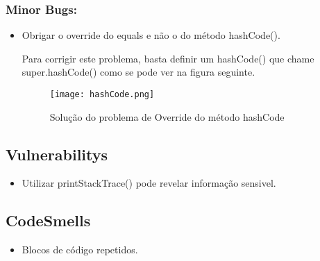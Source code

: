 \subsubsection{Minor Bugs:}
\begin{itemize}
\item Obrigar o override do equals e não o do método hashCode().\newline


\par Para corrigir este problema, basta definir um hashCode() que chame super.hashCode() como se pode ver na figura seguinte.

\begin{figure}[H]

  \centering

  \texttt{[image: hashCode.png]}

  \caption {Solução do problema de Override do método hashCode}

  \label {fig08}

\end{figure}

\end{itemize}


\subsection{Vulnerabilitys}
\begin{itemize}
\item Utilizar printStackTrace() pode revelar informação sensivel.\newline
\end{itemize}

\subsection{CodeSmells}

\begin{itemize}
\item Blocos de código repetidos.\newline
\end{itemize}





